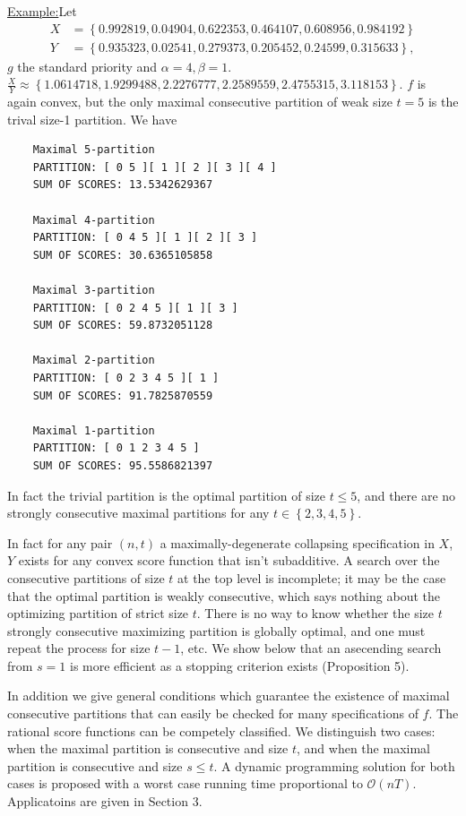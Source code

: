 \documentclass{article}
\theoremstyle{case}
\newenvironment{example}[1]{\par\noindent\underline{Example:}\space#1}{}
\begin{document}
\begin{example}
Let 
\begin{align*}
X & = \left\lbrace 0.992819, 0.04904, 0.622353, 0.464107, 0.608956, 0.984192 \right\rbrace \\
Y & = \left\lbrace 0.935323, 0.02541, 0.279373, 0.205452, 0.24599, 0.315633 \right\rbrace,
\end{align*}
$g$ the standard priority and $\alpha = 4, \beta = 1$. $\frac{X}{Y} \approx \left\lbrace 1.0614718, 1.9299488, 2.2276777, 2.2589559, 2.4755315, 3.118153 \right\rbrace$. $f$ is again convex, but the only maximal consecutive partition of weak size $t = 5$ is the trival size-1 partition. We have

\begin{verbatim}
    Maximal 5-partition
    PARTITION: [ 0 5 ][ 1 ][ 2 ][ 3 ][ 4 ]
    SUM OF SCORES: 13.5342629367

    Maximal 4-partition
    PARTITION: [ 0 4 5 ][ 1 ][ 2 ][ 3 ]
    SUM OF SCORES: 30.6365105858

    Maximal 3-partition
    PARTITION: [ 0 2 4 5 ][ 1 ][ 3 ]
    SUM OF SCORES: 59.8732051128

    Maximal 2-partition
    PARTITION: [ 0 2 3 4 5 ][ 1 ]
    SUM OF SCORES: 91.7825870559

    Maximal 1-partition
    PARTITION: [ 0 1 2 3 4 5 ]
    SUM OF SCORES: 95.5586821397
\end{verbatim}
In fact the trivial partition is the optimal partition of size $t \leq 5$, and there are no strongly consecutive maximal partitions for any $t \in \left\lbrace 2, 3, 4, 5\right\rbrace$.

\end{example}

In fact for any pair $\left( n, t\right)$ a maximally-degenerate collapsing specification in $X$, $Y$ exists for any convex score function that isn't subadditive. A search over the consecutive partitions of size $t$ at the top level is incomplete; it may be the case that the optimal partition is weakly consecutive, which says nothing about the optimizing partition of strict size $t$. There is no way to know whether the size $t$ strongly consecutive maximizing partition is globally optimal, and one must repeat the process for size $t-1$, etc. We show below that an asecending search from $s=1$ is more efficient as a stopping criterion exists (Proposition 5).

In addition we give general conditions which guarantee the existence of maximal consecutive partitions that can easily be checked for many specifications of $f$. The rational score functions can be competely classified. We distinguish two cases: when the maximal partition is consecutive and size $t$, and when the maximal partition is consecutive and size $s \leq t$. A dynamic programming solution for both cases is proposed with a worst case running time proportional to $\mathcal{O}(nT)$. Applicatoins are given in Section 3.
\end{document}
